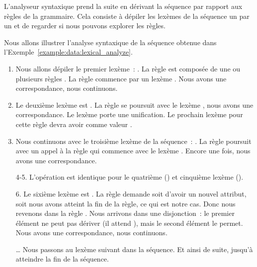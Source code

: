 L'analyseur syntaxique prend la suite en dérivant la séquence par rapport aux
règles de la grammaire. Cela consiste à dépiler les lexèmes de la séquence un
par un et de regarder si nous pouvons explorer les règles.

\begin{example}[Analyse syntaxique de \code{<a x="y"><b /><c>foo</c></a>}]
\label{example:data:syntactic_analyze}

Nous allons illustrer l'analyse syntaxique de la séquence obtenue dans
l'Exem\-ple~\ref{example:data:lexical_analyze}.

\begin{enumerate}

\item Nous allons dépiler le premier lexème~: . La règle  est
composée de une ou plusieurs règles . La règle  commence par
un lexème . Nous avons une correspondance, nous continuons.

\item Le deuxième lexème est . La règle  se poursuit avec
le lexème , nous avons une correspondance. Le lexème 
porte une unification. Le prochain lexème  pour cette règle devra
avoir comme valeur .

\item Nous continuons avec le troisième lexème de la séquence~: . La
règle  poursuit avec un appel à la règle  qui
commence avec le lexème . Encore une fois, nous avons une
correspondance.

\item[4-5.] L'opération est identique pour le quatrième () et
cinquième lexème ().

\item[6.] Le sixième lexème est . La règle  demande
soit d'avoir un nouvel attribut, soit nous avons atteint la fin de la règle, ce
qui est notre cas. Donc nous revenons dans la règle . Nous arrivons
dans une disjonction~: le premier élément ne peut pas dériver  (il
attend ), mais le second élément le permet. Nous avons une
correspondance, nous continuons.

\item[…] Nous passons au lexème suivant dans la séquence. Et ainsi de suite,
jusqu'à atteindre la fin de la séquence.

\end{enumerate}

\end{example}

